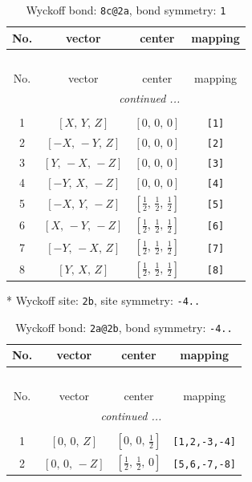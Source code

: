 \documentclass[fleqn,8pt]{jsarticle}
\begin{document}
\renewcommand{\arraystretch}{1.2}
\begin{longtable}{cccc}
\caption{Wyckoff bond: {\tt 8c@2a}, bond symmetry: {\tt 1}}
 \\
 \hline \hline
No. & vector & center & mapping \\ \hline \endfirsthead

\multicolumn{3}{l}{\tablename\ \thetable{}} \\
 \hline \hline
No. & vector & center & mapping \\ \hline \endhead

 \hline \hline
\multicolumn{3}{r}{\footnotesize\it continued ...} \\ \endfoot

 \hline \hline
\multicolumn{3}{r}{} \\ \endlastfoot

1 & $\left[ X,\, Y,\, Z \right]$ & $\left[ 0,\, 0,\, 0 \right]$ & {\tt [1]} \\ \hline
2 & $\left[ - X,\, - Y,\, Z \right]$ & $\left[ 0,\, 0,\, 0 \right]$ & {\tt [2]} \\ \hline
3 & $\left[ Y,\, - X,\, - Z \right]$ & $\left[ 0,\, 0,\, 0 \right]$ & {\tt [3]} \\ \hline
4 & $\left[ - Y,\, X,\, - Z \right]$ & $\left[ 0,\, 0,\, 0 \right]$ & {\tt [4]} \\ \hline
5 & $\left[ - X,\, Y,\, - Z \right]$ & $\left[ \frac{1}{2},\, \frac{1}{2},\, \frac{1}{2} \right]$ & {\tt [5]} \\ \hline
6 & $\left[ X,\, - Y,\, - Z \right]$ & $\left[ \frac{1}{2},\, \frac{1}{2},\, \frac{1}{2} \right]$ & {\tt [6]} \\ \hline
7 & $\left[ - Y,\, - X,\, Z \right]$ & $\left[ \frac{1}{2},\, \frac{1}{2},\, \frac{1}{2} \right]$ & {\tt [7]} \\ \hline
8 & $\left[ Y,\, X,\, Z \right]$ & $\left[ \frac{1}{2},\, \frac{1}{2},\, \frac{1}{2} \right]$ & {\tt [8]} \\
\end{longtable}
* Wyckoff site: {\tt 2b}, site symmetry: {\tt -4..}
\renewcommand{\arraystretch}{1.2}
\begin{longtable}{cccc}
\caption{Wyckoff bond: {\tt 2a@2b}, bond symmetry: {\tt -4..}}
 \\
 \hline \hline
No. & vector & center & mapping \\ \hline \endfirsthead

\multicolumn{3}{l}{\tablename\ \thetable{}} \\
 \hline \hline
No. & vector & center & mapping \\ \hline \endhead

 \hline \hline
\multicolumn{3}{r}{\footnotesize\it continued ...} \\ \endfoot

 \hline \hline
\multicolumn{3}{r}{} \\ \endlastfoot

1 & $\left[ 0,\, 0,\, Z \right]$ & $\left[ 0,\, 0,\, \frac{1}{2} \right]$ & {\tt [1,2,-3,-4]} \\ \hline
2 & $\left[ 0,\, 0,\, - Z \right]$ & $\left[ \frac{1}{2},\, \frac{1}{2},\, 0 \right]$ & {\tt [5,6,-7,-8]} \\
\end{longtable}
\end{document}
